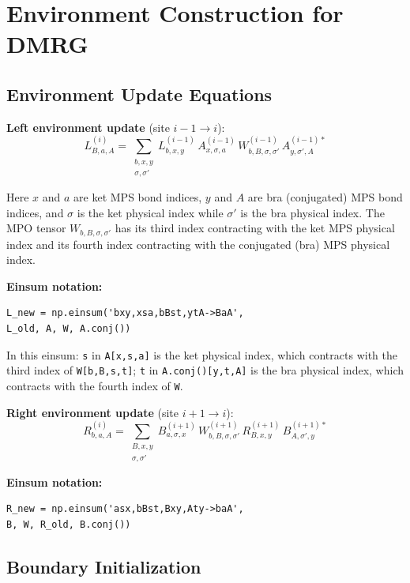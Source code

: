 \documentclass[aps,prb,onecolumn,scriptaddress]{revtex4-2}
\begin{document}
	\section{Environment Construction for DMRG}
	
	\subsection{Environment Update Equations}
	
	\textbf{Left environment update} (site $i-1 \to i$):
	\begin{equation}
		L^{(i)}_{B, a, A} = \sum_{\substack{b, x, y \\ \sigma, \sigma'}} 
L^{(i-1)}_{b, x, y} \, 
A^{(i-1)}_{x, \sigma, a} \,
W^{(i-1)}_{b, B, \sigma, \sigma'} \,
A^{(i-1)*}_{y, \sigma', A}
\end{equation}

Here $x$ and $a$ are ket MPS bond indices, $y$ and $A$ are bra (conjugated) MPS bond indices, and $\sigma$ is the ket physical index while $\sigma'$ is the bra physical index. The MPO tensor $W_{b,B,\sigma,\sigma'}$ has its third index contracting with the ket MPS physical index and its fourth index contracting with the conjugated (bra) MPS physical index.

\textbf{Einsum notation:}
\begin{verbatim}
L_new = np.einsum('bxy,xsa,bBst,ytA->BaA', 
L_old, A, W, A.conj())
\end{verbatim}
In this einsum: \texttt{s} in \texttt{A[x,s,a]} is the ket physical index, which contracts with the third index of \texttt{W[b,B,s,t]}; \texttt{t} in \texttt{A.conj()[y,t,A]} is the bra physical index, which contracts with the fourth index of \texttt{W}.

\textbf{Right environment update} (site $i+1 \to i$):
\begin{equation}
R^{(i)}_{b, a, A} = \sum_{\substack{B, x, y \\ \sigma, \sigma'}} 
B^{(i+1)}_{a, \sigma, x} \,
W^{(i+1)}_{b, B, \sigma, \sigma'} \,
R^{(i+1)}_{B, x, y} \,
B^{(i+1)*}_{A, \sigma', y}
\end{equation}

\textbf{Einsum notation:}
\begin{verbatim}
R_new = np.einsum('asx,bBst,Bxy,Aty->baA',
B, W, R_old, B.conj())
\end{verbatim}

\subsection{Boundary Initialization}
\end{document}
